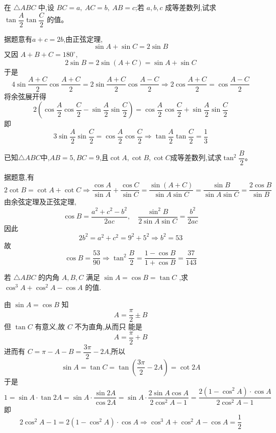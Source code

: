 \begin{questions}
    \question 在 $\triangle ABC$ 中,设 ${BC}=a,\ {AC}=b,\ {AB}=c$;若 $a,b,c$ 成等差数列,试求 $\tan\dfrac{A}{2}\tan\dfrac{C}{2}$ 的值。
    \begin{solution}
        据题意有$a + c = 2b$,由正弦定理,
        \[
        \sin A + \sin C = 2\sin B 
        \]
        又因 $A + B + C = 180^\circ,$
        \[
        2\sin B = 2\sin(A + C) = \sin A + \sin C
        \]
        于是
        \[
        4\sin\frac{A + C}{2}\cos\frac{A + C}{2} = 2\sin\frac{A + C}{2}\cos\frac{A - C}{2}
        \Rightarrow 2\cos\frac{A + C}{2} = \cos\frac{A - C}{2}
        \]
        将余弦展开得
        \[
        2\left( \cos\frac{A}{2}\cos\frac{C}{2} - \sin\frac{A}{2}\sin\frac{C}{2} \right)
        =
        \cos\frac{A}{2}\cos\frac{C}{2} + \sin\frac{A}{2}\sin\frac{C}{2}
        \]
        即
        \[
        3\sin\frac{A}{2}\sin\frac{C}{2} = \cos\frac{A}{2}\cos\frac{C}{2}
        \Rightarrow
        \tan\frac{A}{2} \tan\frac{C}{2} = \frac{1}{3}
        \]
    \end{solution}

    \question 已知$\triangle ABC$中,$AB=5,BC=9$,且$\cot A, \cot B, \cot C$成等差数列,试求$\tan^{2}\dfrac{B}{2}$。
    \begin{solution}
        据题意,有
        \[
        2 \cot B = \cot A + \cot C \Rightarrow \frac{\cos A}{\sin A} + \frac{\cos C}{\sin C} = \frac{\sin (A+C)}{\sin A \sin C} = \frac{\sin B}{\sin A \sin C} = \frac{2 \cos B}{\sin B}
        \]
        由余弦定理及正弦定理,
        \[
        \cos B = \frac{a^2 + c^2 - b^2}{2 a c}, \quad \frac{\sin^2 B}{2 \sin A \sin C} = \frac{b^2}{2 a c}
        \]
        因此
        \[
        2 b^2 = a^2 + c^2 = 9^2+5^2 \Rightarrow b^2 = 53 
        \]
        故
        \[
        \cos B = \frac{53}{90} \Rightarrow \tan^2 \frac{B}{2} = \frac{1 - \cos B}{1 + \cos B}= \frac{37}{143}
        \]
    \end{solution}

    \question 若 $\triangle ABC$ 的内角 $A,B,C$ 满足 $\sin A=\cos B=\tan C$ ,求 $\cos^{3}A+\cos^{2}A-\cos A$ 的值.
    \begin{solution}
        由 $\sin A=\cos B$ 知 $$A=\dfrac{\pi}{2}\pm B$$但 $\tan C$ 有意义,故 $C$ 不为直角,从而只
        能是 $$A=\frac{\pi}{2}+B$$
        进而有 $C=\pi-A-B=\dfrac{3\pi}{2}-2A$,所以 $$\sin A=\tan C=\tan\left(\frac{3\pi}{2}-2A\right)=\cot 2A$$
        于是
        \[1 = \sin A \cdot \tan 2A = \sin A \cdot \frac{\sin 2A}{\cos 2A} = \sin A \cdot \frac{2 \sin A \cos A}{2 \cos^2 A - 1}
        = \frac{2(1 - \cos^2 A) \cdot \cos A}{2 \cos^2 A - 1}\]
        即 
        \[
        2 \cos^2 A - 1 = 2(1 - \cos^2 A) \cdot \cos A \Rightarrow \cos^3 A + \cos^2 A - \cos A = \frac{1}{2}
        \]
    \end{solution}
    

\end{questions}

